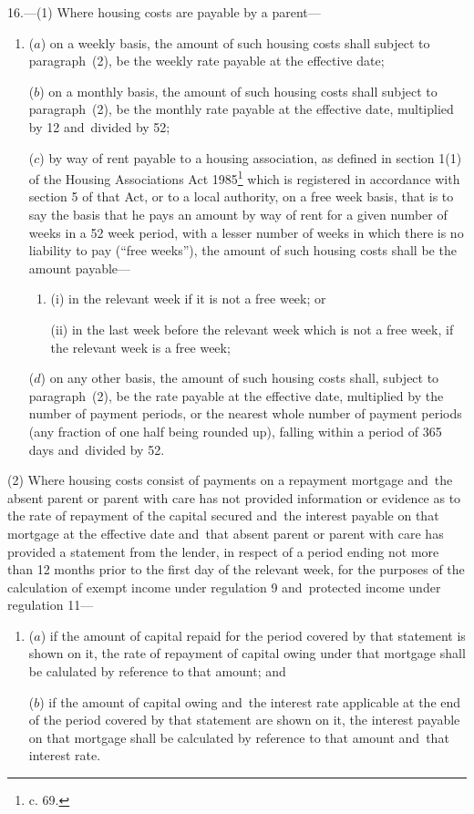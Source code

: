 \documentclass[12pt,a4paper]{article}
\begin{document}
16.—(1) 
Where housing costs are payable by a parent---  %
\begin{enumerate}\item[]
($a$) on a weekly basis, the amount of such housing costs shall subject to paragraph~(2), be the weekly rate payable at the effective date;

($b$) on a monthly basis, the amount of such housing costs shall subject to paragraph~(2), be the monthly rate payable at the effective date, multiplied by 12 and~divided by 52;

($c$) by way of rent payable to a housing association, as defined in section 1(1) of the Housing Associations Act 1985\footnote{ c. 69.} which is registered in accordance with section 5 of that Act, or to a local authority, on a free week basis, that is to say the basis that he pays an amount by way of rent for a given number of weeks in a 52 week period, with a lesser number of weeks in which there is no liability to pay (“free weeks”), the amount of such housing costs shall be 
the amount payable---  %
\begin{enumerate}\item[]
(i) in the relevant week if it is not a free week; or

(ii) in the last week before the relevant week which is not a free week, if the relevant week is a free week;
\end{enumerate}

($d$) on any other basis, the amount of such housing costs shall, subject to paragraph~(2), be the rate payable at the effective date, multiplied by the number of payment periods, or the nearest whole number of payment periods (any fraction of one half being rounded up), falling within a period of 365 days and~divided by 52.
\end{enumerate}

(2) Where housing costs consist of payments on a repayment mortgage and~the absent parent or parent with care has not provided information or evidence as to the rate of repayment of the capital secured and~the interest payable on that mortgage at the effective date and~that absent parent or parent with care has provided a statement from the lender, in respect of a period ending not more than 12 months prior to the first day of the relevant week, for the purposes of the calculation of exempt income under regulation 9 and~protected income under regulation 11—
\begin{enumerate}\item[]
($a$) if the amount of capital repaid for the period covered by that statement is shown on it, the rate of repayment of capital owing under that mortgage shall be calulated by reference to that amount; and

($b$) if the amount of capital owing and~the interest rate applicable at the end of the period covered by that statement are shown on it, the interest payable on that mortgage shall be calculated by reference to that amount and~that interest rate.
\end{enumerate}
\end{document}
